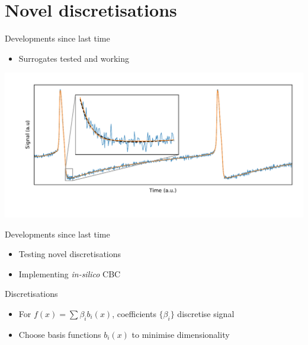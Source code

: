 \documentclass[presentation]{beamer}
\begin{document}
\section{Novel discretisations}
\label{sec:org9f06641}
\begin{frame}[label={sec:orgd45f45b}]{Developments since last time}
\begin{itemize}
\item Surrogates tested and working
\end{itemize}

\begin{center}
\includegraphics[width=.9\linewidth]{./surrogate.pdf}
\end{center}
\end{frame}

\begin{frame}[label={sec:orgc0f7230}]{Developments since last time}
\begin{itemize}
\item Testing novel discretisations
\end{itemize}
\vfill
\begin{itemize}
\item Implementing \emph{in-silico} CBC
\end{itemize}
\end{frame}

\begin{frame}[label={sec:org0c070ec}]{Discretisations}
\begin{itemize}
\item For \(f(x) = \sum \beta_i b_i(x)\), coefficients \(\{\beta_i\}\) discretise signal
\end{itemize}
\vfill
\begin{itemize}
\item Choose basis functions \(b_i(x)\) to minimise dimensionality
\end{itemize}
\end{frame}
\end{document}
